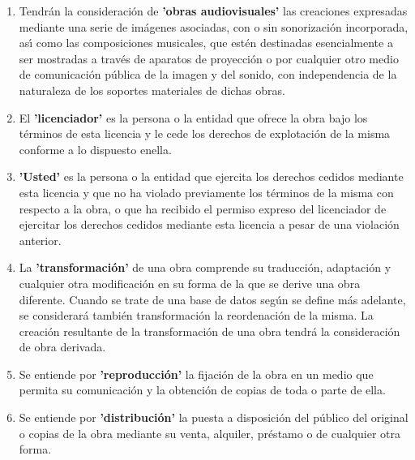 \begin{enumerate}
\begin{enumerate}
    Para evitar la duda, si la obra consiste en una composici\'on
    musical o grabaci\'on de sonidos, la sincronizaci\'on temporal de
    la obra con una imagen en movimiento ('synching') ser\'a
    considerada como una obra derivada a los efectos de esta licencia.

  \item Tendr\'an la consideraci\'on de \textbf{'obras audiovisuales'}
    las creaciones expresadas mediante una serie de im\'agenes
    asociadas, con o sin sonorizaci\'on incorporada, as\'\i{} como las
    composiciones musicales, que est\'en destinadas esencialmente a
    ser mostradas a trav\'es de aparatos de proyecci\'on o por
    cualquier otro medio de comunicaci\'on p\'ublica de la imagen y
    del sonido, con independencia de la naturaleza de los soportes
    materiales de dichas obras.

  \item El \textbf{'licenciador'} es la persona o la entidad que
    ofrece la obra bajo los t\'erminos de esta licencia y le cede los
    derechos de explotaci\'on de la misma conforme a lo dispuesto
    enella.

  \item \textbf{'Usted'} es la persona o la entidad que ejercita los
    derechos cedidos mediante esta licencia y que no ha violado
    previamente los t\'erminos de la misma con respecto a la obra, o
    que ha recibido el permiso expreso del licenciador de ejercitar
    los derechos cedidos mediante esta licencia a pesar de una
    violaci\'on anterior.

  \item La \textbf{'transformaci\'on'} de una obra comprende su
    traducci\'on, adaptaci\'on y cualquier otra modificaci\'on en su
    forma de la que se derive una obra diferente.  Cuando se trate de
    una base de datos seg\'un se define m\'as adelante, se
    considerar\'a tambi\'en transformaci\'on la reordenaci\'on de la
    misma. La creaci\'on resultante de la transformaci\'on de una obra
    tendr\'a la consideraci\'on de obra derivada.

  \item Se entiende por \textbf{'reproducci\'on'} la fijaci\'on de la
    obra en un medio que permita su comunicaci\'on y la obtenci\'on de
    copias de toda o parte de ella.

  \item Se entiende por \textbf{'distribuci\'on'} la puesta a
    disposici\'on del p\'ublico del original o copias de la obra
    mediante su venta, alquiler, pr\'estamo o de cualquier otra forma.


\end{enumerate}
\end{enumerate}
